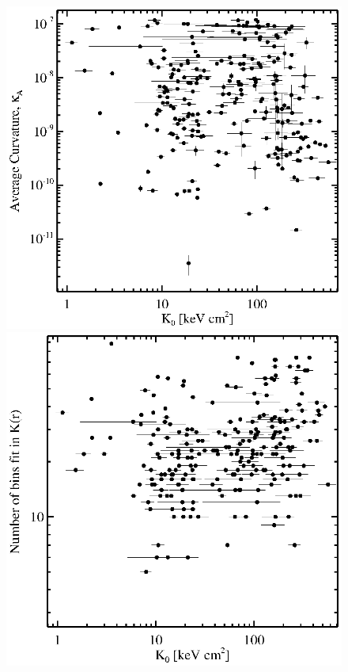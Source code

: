 \begin{center}
  \begin{figure}[htp]
    \begin{minipage}[htp]{0.5\linewidth}
      \includegraphics*[width=\textwidth, trim=28mm 7mm 30mm 17mm, clip]{curvk0.eps}
    \end{minipage}
    \begin{minipage}[htp]{0.5\linewidth}
      \includegraphics*[width=\textwidth, trim=28mm 7mm 30mm 17mm, clip]{nbins_k0.eps}

\end{minipage}
\end{figure}
\end{center}
